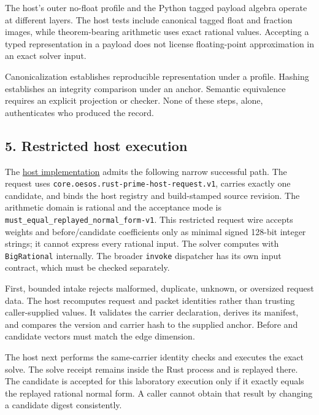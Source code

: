 \documentclass[
  11pt,
]{article}
\newcommand{\passthrough}[1]{#1}
\begin{document}
The host's outer no-float profile and the Python tagged payload algebra
operate at different layers. The host tests include canonical tagged
float and fraction images, while theorem-bearing arithmetic uses exact
rational values. Accepting a typed representation in a payload does not
license floating-point approximation in an exact solver input.

Canonicalization establishes reproducible representation under a
profile. Hashing establishes an integrity comparison under an anchor.
Semantic equivalence requires an explicit projection or checker. None of
these steps, alone, authenticates who produced the record.

\subsection{5. Restricted host
execution}\label{restricted-host-execution}

The
\href{https://github.com/dbccpage/the_symbol_game/blob/52cb5457f6c485ba548cfd292f6012a941ed22cf/engine/crates_rs/core_symbol_game/src/host.rs}{host
implementation} admits the following narrow successful path. The request
uses \nolinkurl{core.oesos.rust-prime-host-request.v1}, carries exactly
one candidate, and binds the host registry and build-stamped source
revision. The arithmetic domain is rational and the acceptance mode is
\nolinkurl{must_equal_replayed_normal_form-v1}. This restricted request
wire accepts weights and before/candidate coefficients only as minimal
signed 128-bit integer strings; it cannot express every rational input.
The solver computes with \passthrough{\lstinline!BigRational!}
internally. The broader \passthrough{\lstinline!invoke!} dispatcher has
its own input contract, which must be checked separately.

First, bounded intake rejects malformed, duplicate, unknown, or
oversized request data. The host recomputes request and packet
identities rather than trusting caller-supplied values. It validates the
carrier declaration, derives its manifest, and compares the version and
carrier hash to the supplied anchor. Before and candidate vectors must
match the edge dimension.

The host next performs the same-carrier identity checks and executes the
exact solve. The solve receipt remains inside the Rust process and is
replayed there. The candidate is accepted for this laboratory execution
only if it exactly equals the replayed rational normal form. A caller
cannot obtain that result by changing a candidate digest consistently.
\end{document}
